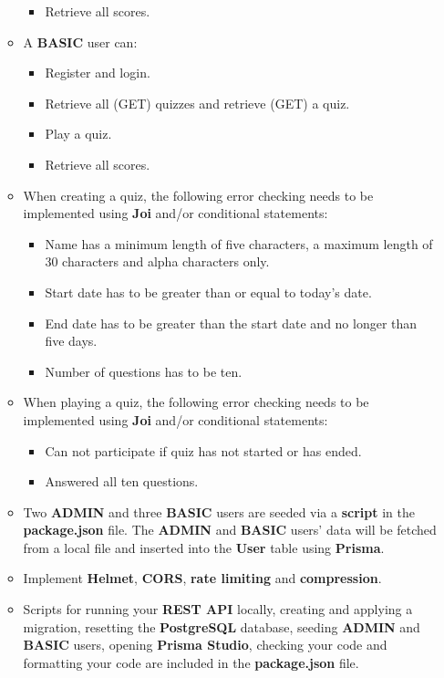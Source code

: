 \documentclass{article}
\begin{document}
\begin{itemize}
\begin{itemize}
\begin{itemize}
			\item Retrieve all scores.
		\end{itemize}
		\item A \textbf{BASIC} user can:
		\begin{itemize}
			\item Register and login.
			\item Retrieve all (GET) quizzes and retrieve (GET) a quiz.  	
			\item Play a quiz.
			\item Retrieve all scores.
		\end{itemize}
		\item When creating a quiz, the following error checking needs to be implemented using \textbf{Joi} and/or conditional statements:
		\begin{itemize}
			\item Name has a minimum length of five characters, a maximum length of 30 characters and alpha characters only.
			\item Start date has to be greater than or equal to today's date.
			\item End date has to be greater than the start date and no longer than five days. 
			\item Number of questions has to be ten.
		\end{itemize}
		\item When playing a quiz, the following error checking needs to be implemented using \textbf{Joi} and/or conditional statements:
		\begin{itemize}
			\item Can not participate if quiz has not started or has ended.
			\item Answered all ten questions.
		\end{itemize}
		\item Two \textbf{ADMIN} and three \textbf{BASIC} users are seeded via a \textbf{script} in the \textbf{package.json} file. The \textbf{ADMIN} and \textbf{BASIC} users' data will be fetched from a local file and inserted into the \textbf{User} table using \textbf{Prisma}.  
		\item Implement \textbf{Helmet}, \textbf{CORS}, \textbf{rate limiting} and \textbf{compression}.
		\item Scripts for running your \textbf{REST API} locally, creating and applying a migration, resetting the \textbf{PostgreSQL} database, seeding \textbf{ADMIN} and \textbf{BASIC} users, opening \textbf{Prisma Studio}, checking your code and formatting your code are included in the \textbf{package.json} file.

\end{itemize}
\end{itemize}
\end{document}
